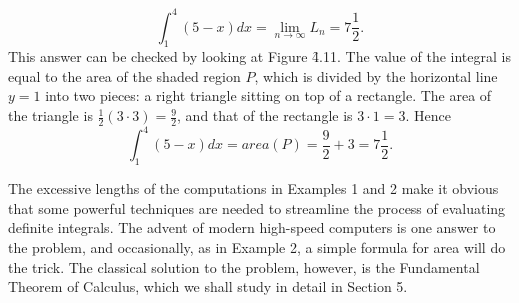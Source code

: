 \begin{example}
$$
\int_{1}^{4} (5 - x) dx = \lim_{n \rightarrow \infty} L_n = 7 \frac{1}{2}.
$$
\noindent This answer can be checked by looking at Figure \f{4.11}. The value of the integral is equal to the area of the shaded region $P$, which is divided by the horizontal line $y = 1$ into two pieces: a right triangle sitting on top of a rectangle. The area of the triangle is $\frac{1}{2} (3 \cdot 3) = \frac{9}{2}$, 
and that of the rectangle is $3 \cdot 1 = 3$. Hence  
$$
\int_{1}^{4} (5 - x) dx = area(P) = \frac{9}{2} + 3 = 7\frac{1}{2}.
$$
\end{example}
\medskip

The excessive lengths of the computations in Examples 1 and 2 make it obvious that some powerful techniques are needed to streamline the process of evaluating definite integrals. The advent of modern high-speed computers is one answer to the problem, and occasionally, as in Example 2, a simple formula for area will do the trick. The classical solution to the problem,
however, is the Fundamental Theorem of Calculus, which we shall study in detail in Section 5.

